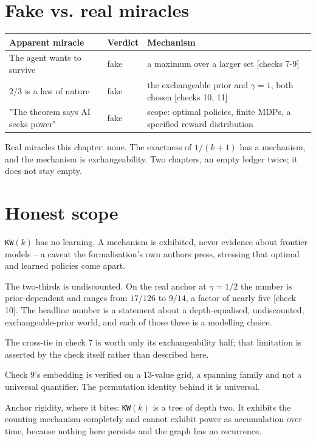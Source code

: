 \section*{Fake vs. real miracles}

\noindent

\noindent
\begin{tabularx}{\textwidth}{XlX}
\toprule
Apparent miracle & Verdict & Mechanism \\
\midrule
The agent wants to survive & fake & a maximum over a larger set [checks 7-9] \\
$2/3$ is a law of nature & fake & the exchangeable prior and $\gamma = 1$, both chosen [checks 10, 11] \\
"The theorem says AI seeks power" & fake & scope: optimal policies, finite MDPs, a specified reward distribution \\
\bottomrule
\end{tabularx}
\par\medskip

Real miracles this chapter: none. The exactness of $1/(k+1)$ has a mechanism, and the mechanism is exchangeability. Two chapters, an empty ledger twice; it does not stay empty.

\section*{Honest scope}

\texttt{KW}$(k)$ has no learning. A mechanism is exhibited, never evidence about frontier models -- a caveat the formalisation's own authors press, stressing that optimal and learned policies come apart.

The two-thirds is undiscounted. On the real anchor at $\gamma = 1/2$ the number is prior-dependent and ranges from $17/126$ to $9/14$, a factor of nearly five [check 10]. The headline number is a statement about a depth-equalised, undiscounted, exchangeable-prior world, and each of those three is a modelling choice.

The cross-tie in check 7 is worth only its exchangeability half; that limitation is asserted by the check itself rather than described here.

Check 9's embedding is verified on a 13-value grid, a spanning family and not a universal quantifier. The permutation identity behind it is universal.

Anchor rigidity, where it bites: \texttt{KW}$(k)$ is a tree of depth two. It exhibits the counting mechanism completely and cannot exhibit power as accumulation over time, because nothing here persists and the graph has no recurrence.

